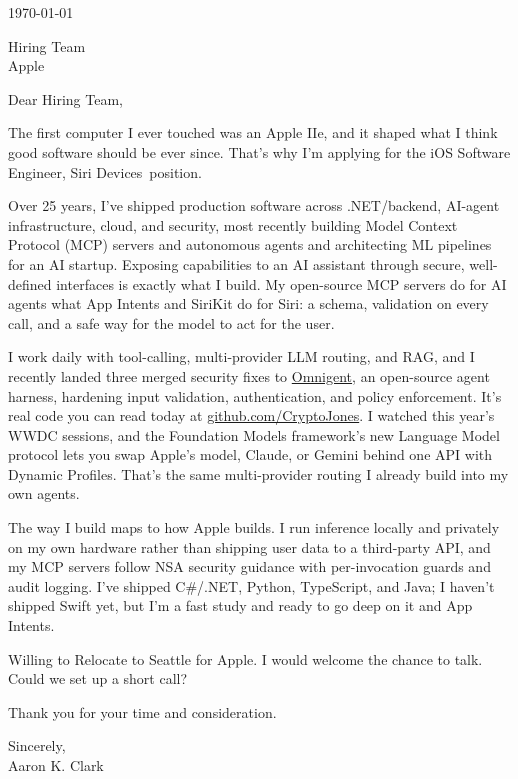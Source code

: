 \documentclass{resume}
\def\company{Apple}
\def\role{iOS Software Engineer, Siri Devices}
\def\manager{Hiring Team}          %
\begin{document}
\vspace{0.5em}
\today

\bigskip
\noindent \manager \\
\company

\bigskip
\noindent Dear \manager,

The first computer I ever touched was an Apple IIe, and it shaped what I think good software should be ever since. That's why I'm applying for the \role\ position.

Over 25 years, I've shipped production software across .NET/backend, AI-agent infrastructure, cloud, and security, most recently building Model Context Protocol (MCP) servers and autonomous agents and architecting ML pipelines for an AI startup. Exposing capabilities to an AI assistant through secure, well-defined interfaces is exactly what I build. My open-source MCP servers do for AI agents what App Intents and SiriKit do for Siri: a schema, validation on every call, and a safe way for the model to act for the user.

I work daily with tool-calling, multi-provider LLM routing, and RAG, and I recently landed three merged security fixes to \href{https://github.com/omnigent-ai/omnigent}{Omnigent}, an open-source agent harness, hardening input validation, authentication, and policy enforcement. It's real code you can read today at \href{https://github.com/CryptoJones}{github.com/CryptoJones}. I watched this year's WWDC sessions, and the Foundation Models framework's new Language Model protocol lets you swap Apple's model, Claude, or Gemini behind one API with Dynamic Profiles. That's the same multi-provider routing I already build into my own agents.

The way I build maps to how Apple builds. I run inference locally and privately on my own hardware rather than shipping user data to a third-party API, and my MCP servers follow NSA security guidance with per-invocation guards and audit logging. I've shipped C\#/.NET, Python, TypeScript, and Java; I haven't shipped Swift yet, but I'm a fast study and ready to go deep on it and App Intents.

Willing to Relocate to Seattle for Apple. I would welcome the chance to talk. Could we set up a short call?

\bigskip
\noindent Thank you for your time and consideration.

\bigskip
\noindent Sincerely, \\[1em]
Aaron K. Clark
\end{document}
